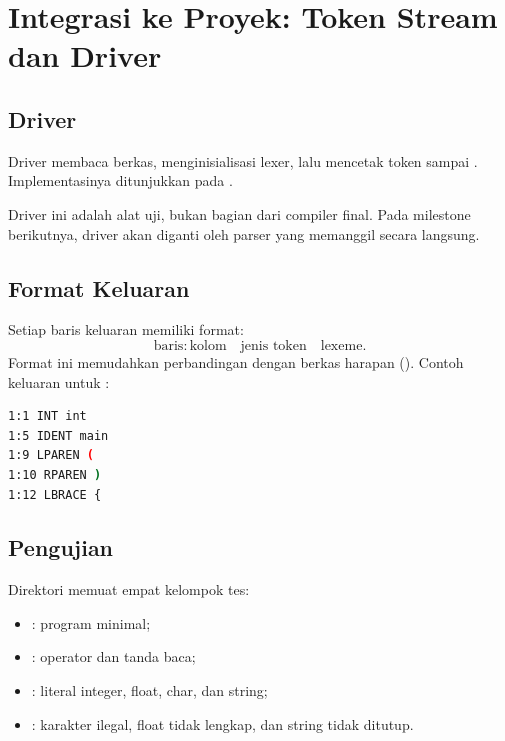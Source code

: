 \section{Integrasi ke Proyek: Token Stream dan Driver}
\label{sec:ch07-integrasi}

\subsection{Driver}

Driver membaca berkas, menginisialisasi lexer, lalu mencetak token
sampai . Implementasinya ditunjukkan pada
.


Driver ini adalah alat uji, bukan bagian dari compiler final. Pada
milestone berikutnya, driver akan diganti oleh parser yang memanggil
 secara langsung.

\subsection{Format Keluaran}

Setiap baris keluaran memiliki format:
\[
\text{baris} : \text{kolom} \quad \text{jenis token} \quad
\text{lexeme}.
\]
Format ini memudahkan perbandingan dengan berkas harapan
(). Contoh keluaran untuk :
\begin{lstlisting}[language=bash]
1:1 INT int
1:5 IDENT main
1:9 LPAREN (
1:10 RPAREN )
1:12 LBRACE {
\end{lstlisting}

\subsection{Pengujian}

Direktori  memuat empat kelompok tes:
\begin{itemize}[leftmargin=*]
  \item {}: program minimal;
  \item {}: operator dan tanda baca;
  \item {}: literal integer, float, char, dan string;
  \item {}: karakter ilegal, float tidak lengkap, dan
        string tidak ditutup.
\end{itemize}

